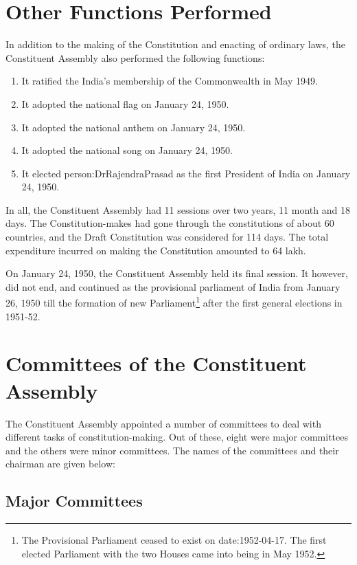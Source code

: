 \section{Other Functions Performed}

In addition to the making of the Constitution and enacting of ordinary laws, the Constituent Assembly also performed the following functions:

\begin{enumerate}
  \item It ratified the India's membership of the Commonwealth in May 1949.
  \item It adopted the national flag on January 24, 1950.
  \item It adopted the national anthem on January 24, 1950.
  \item It adopted the national song on January 24, 1950.
  \item It elected \gls{person:DrRajendraPrasad} as the first President of India on January 24, 1950.
\end{enumerate}

In all, the Constituent Assembly had 11 sessions over two years, 11 month and 18 days. The Constitution-makes had gone through the constitutions of about 60 countries, and the Draft Constitution was considered for 114 days. The total expenditure incurred on making the Constitution amounted to 64 lakh.

On January 24, 1950, the Constituent Assembly held its final session. It however, did not end, and continued as the provisional parliament of India from January 26, 1950 till the formation of new Parliament\footnote{The Provisional Parliament ceased to exist on \gls{date:1952-04-17}. The first elected Parliament with the two Houses came into being in May 1952.} after the first general elections in 1951-52.

\section{Committees of the Constituent Assembly}

The Constituent Assembly appointed a number of committees to deal with different tasks of constitution-making. Out of these, eight were major committees and the others were minor committees. The names of the committees and their chairman are given below:

\subsection{Major Committees}

